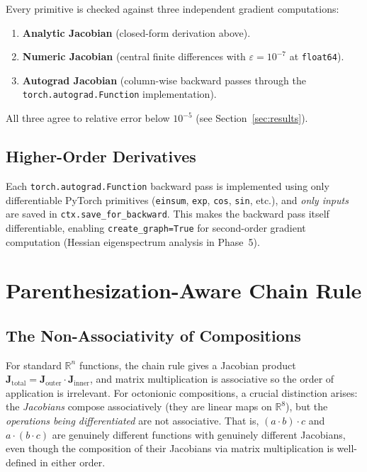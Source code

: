 \documentclass[11pt]{article}
\newcommand{\RR}{\mathbb{R}}
\begin{document}
Every primitive is checked against three independent gradient computations:
\begin{enumerate}
  \item \textbf{Analytic Jacobian} (closed-form derivation above).
  \item \textbf{Numeric Jacobian} (central finite differences with
        $\varepsilon = 10^{-7}$ at \texttt{float64}).
  \item \textbf{Autograd Jacobian} (column-wise backward passes through the
        \texttt{torch.autograd.Function} implementation).
\end{enumerate}
All three agree to relative error below $10^{-5}$ (see Section~\ref{sec:results}).

\subsection{Higher-Order Derivatives}

Each \texttt{torch.autograd.Function} backward pass is implemented
using only differentiable PyTorch primitives (\texttt{einsum},
\texttt{exp}, \texttt{cos}, \texttt{sin}, etc.), and \emph{only inputs} are
saved in \texttt{ctx.save\_for\_backward}.  This makes the backward pass
itself differentiable, enabling \texttt{create\_graph=True} for second-order
gradient computation (Hessian eigenspectrum analysis in Phase~5).

\section{Parenthesization-Aware Chain Rule}

\subsection{The Non-Associativity of Compositions}

For standard $\RR^n$ functions, the chain rule gives a Jacobian product
$\mathbf{J}_\text{total} = \mathbf{J}_\text{outer} \cdot \mathbf{J}_\text{inner}$,
and matrix multiplication is associative so the order of application is
irrelevant.  For octonionic compositions, a crucial distinction arises: the
\emph{Jacobians} compose associatively (they are linear maps on $\RR^8$), but
the \emph{operations being differentiated} are not associative.  That is,
$(a \cdot b) \cdot c$ and $a \cdot (b \cdot c)$ are genuinely different functions
with genuinely different Jacobians, even though the composition of their
Jacobians via matrix multiplication is well-defined in either order.
\end{document}
